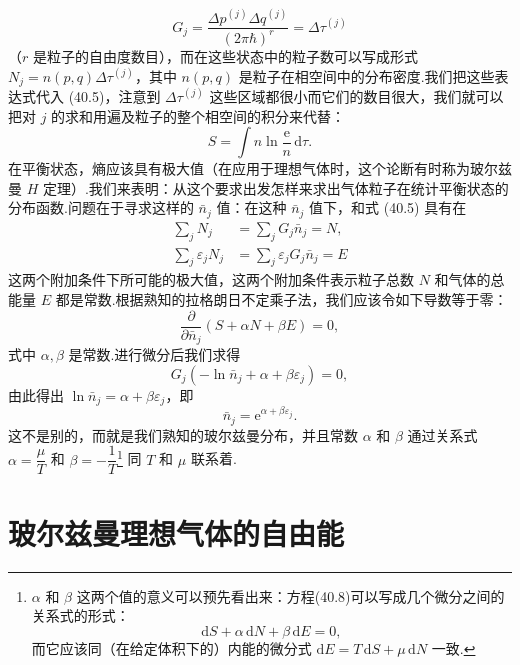 \begin{equation}
  G_j=\frac{\Delta p^{(j)}\Delta q^{(j)}}{(2\pi\hbar)^r}
  =\Delta\tau^{(j)}
\end{equation}
（$r$ 是粒子的自由度数目），而在这些状态中的粒子数可以写成形式 $N_j=n(p,q)\Delta\tau^{(j)}$，其中 $n(p,q)$ 是粒子在相空间中的分布密度.我们把这些表达式代入 (40.5)，注意到 $\Delta\tau^{(j)}$ 这些区域都很小而它们的数目很大，我们就可以把对 $j$ 的求和用遍及粒子的整个相空间的积分来代替：
\begin{equation}
  S=\int n\ln\frac{\mathrm{e}}{n}\,\mathrm{d}\tau.
\end{equation}
在平衡状态，熵应该具有极大值（在应用于理想气体时，这个论断有时称为玻尔兹曼 $H$ 定理）.我们来表明：从这个要求出发怎样来求出气体粒子在统计平衡状态的分布函数.问题在于寻求这样的 $\bar{n}_j$ 值：在这种 $\bar{n}_j$ 值下，和式 (40.5) 具有在
\begin{equation*}
\begin{aligned}
  \sum_j N_j&=\sum_j G_j\bar{n}_j=N,\\
  \sum_j \varepsilon_j N_j&=\sum_j \varepsilon_j G_j\bar{n}_j=E
\end{aligned}
\end{equation*}
这两个附加条件下所可能的极大值，这两个附加条件表示粒子总数 $N$ 和气体的总能量 $E$ 都是常数.根据熟知的拉格朗日不定乘子法，我们应该令如下导数等于零：
\begin{equation}
  \frac{\partial}{\partial\bar{n}_j}\left(S+\alpha N+\beta E\right)=0,
\end{equation}
式中 $\alpha,\beta$ 是常数.进行微分后我们求得
\begin{equation*}
  G_j\left(-\ln\bar{n}_j+\alpha+\beta\varepsilon_j\right)=0,
\end{equation*}
由此得出 $\ln\bar{n}_j=\alpha+\beta\varepsilon_j$，即
\begin{equation*}
  \bar{n}_j=\mathrm{e}^{\alpha+\beta\varepsilon_j}.
\end{equation*}
这不是别的，而就是我们熟知的玻尔兹曼分布，并且常数 $\alpha$ 和 $\beta$ 通过关系式 $\alpha=\dfrac{\mu}{T}$ 和 $\beta=-\dfrac{1}{T}$\footnote{$\alpha$ 和 $\beta$ 这两个值的意义可以预先看出来：方程(40.8)可以写成几个微分之间的关系式的形式：
\begin{equation*}
  \mathrm{d}S+\alpha\,\mathrm{d}N+\beta\,\mathrm{d}E=0,
\end{equation*}
而它应该同（在给定体积下的）内能的微分式 $\mathrm{d}E=T\,\mathrm{d}S+\mu\,\mathrm{d}N$ 一致.} 同 $T$ 和 $\mu$ 联系着.

\section{玻尔兹曼理想气体的自由能}

